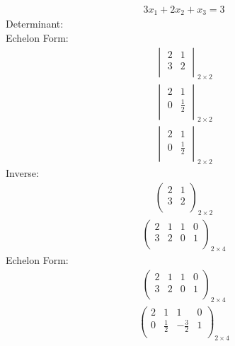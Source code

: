 \documentclass{article}
\begin{document}
\begin{align*}
3x_{1} + 2x_{2} + x_{3}=3\end{align*}
Determinant:\\
Echelon Form:\\
\begin{align*}
\begin{vmatrix}
2 & 1\\
3 & 2\\
\end{vmatrix}_{2\times 2}
\end{align*}
\begin{align*}
\begin{vmatrix}
2 & 1\\
0 & \frac{1}{2}\\
\end{vmatrix}_{2\times 2}
\end{align*}
\begin{align*}
\begin{vmatrix}
2 & 1\\
0 & \frac{1}{2}\\
\end{vmatrix}_{2\times 2}
\end{align*}
Inverse:\\
\begin{align*}
\begin{pmatrix}
2 & 1\\
3 & 2\\
\end{pmatrix}_{2\times 2}
\end{align*}
\begin{align*}
\left(
\begin{array}{cc|cc}
2 & 1 & 1 & 0\\
3 & 2 & 0 & 1\\
\end{array}
\right)_{2\times 4}
\end{align*}
Echelon Form:\\
\begin{align*}
\left(
\begin{array}{cc|cc}
2 & 1 & 1 & 0\\
3 & 2 & 0 & 1\\
\end{array}
\right)_{2\times 4}
\end{align*}
\begin{align*}
\left(
\begin{array}{cc|cc}
2 & 1 & 1 & 0\\
0 & \frac{1}{2} & -\frac{3}{2} & 1\\
\end{array}
\right)_{2\times 4}
\end{align*}
\end{document}

